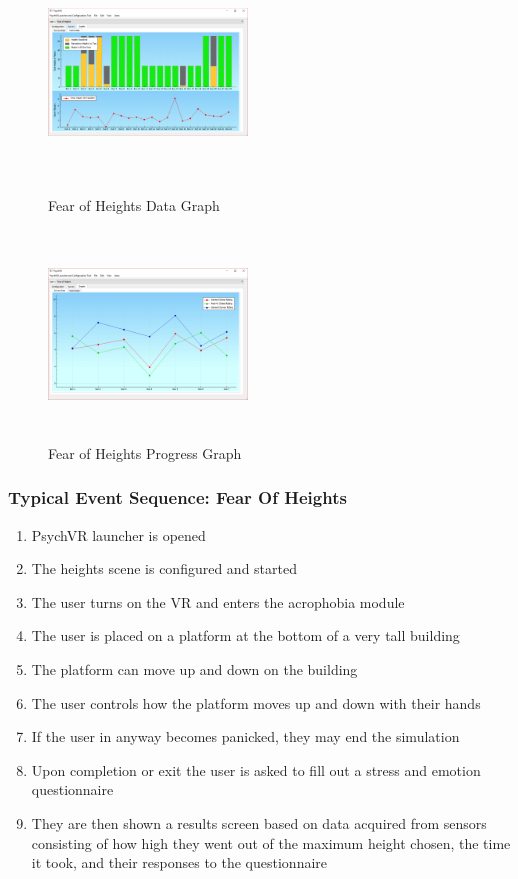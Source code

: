\documentclass[a4paper,10pt]{article}
\begin{document}
\begin{figure}[H]
	\centering
	\begin{minipage}{0.45\textwidth}
		\centering
		\includegraphics[width=200px, height=210px, keepaspectratio]{qtHeightGraph.png}
		\caption{Fear of Heights Data Graph}
		\label{fig:heightQtGraph}
	\end{minipage}\hfill
	\begin{minipage}{0.45\textwidth}
		\centering
		\includegraphics[width=200px, height=210px, keepaspectratio]{qtHeightProgress.png}
		\caption{Fear of Heights Progress Graph}
		\label{fig:heightQtSurveyResults}
	\end{minipage}
\end{figure}

\pagebreak
\subsubsection{Typical Event Sequence: Fear Of Heights}
\begin{enumerate}
	\item PsychVR launcher is opened
	\item The heights scene is configured and started
	\item The user turns on the VR and enters the acrophobia module
	\item The user is placed on a platform at the bottom of a very tall building
	\item The platform can move up and down on the building
	\item The user controls how the platform moves up and down with their hands
	\item If the user in anyway becomes panicked, they may end the simulation
	\item Upon completion or exit the user is asked to fill out a stress and emotion questionnaire
	\item They are then shown a results screen based on data acquired from sensors consisting of how high they went out of the maximum height chosen, the time it took, and their responses to the questionnaire
\end{enumerate}
\pagebreak
\end{document}
